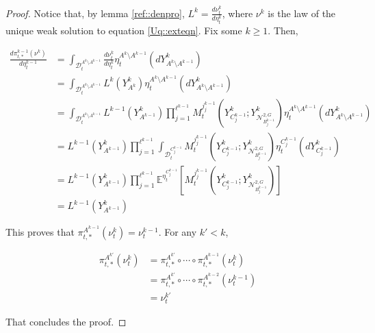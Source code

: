 \documentclass[12pt]{article}
\newcommand{\mb}{\mathbb}
\newcommand{\mc}{\mathcal}
\newcommand{\exmu}[2]{\mb{E}^{#1}\left[#2\right]}	%
\newcommand{\cad}{\mc{D}}							%
\newcommand{\dgneigh}[2]{\mc{N}^{2,#1}_{#2}}		%
\newcommand{\indx}[1]{^{#1}}						%
\newcommand{\proj}{\pi}								%
\newcommand{\vind}[1]{_{#1}}						%
\newcommand{\vpara}[1]{^{#1}}						%
\newcommand{\tpara}[1]{_{#1}}						%
\newcommand{\tparapsf}[1]{_{#1,*}}					%
\newcommand{\psize}{\ell}							%
\newcommand{\Xg}{Y}									%
\newcommand{\mm}{\nu}								%
\newcommand{\mmm}{\eta}								%
\newcommand{\dense}{L}								%
\newcommand{\mdense}{M}								%
\newcommand{\jpara}[1]{^{#1}}						%
\begin{document}
\begin{proof}
Notice that, by lemma \ref{ref::denpro}, \(\dense\indx{k} = \frac{d\mm\indx{k}\tpara{t}}{d\mmm\indx{k}\tpara{t}}\), where \(\mm\indx{k}\) is the law of the unique weak solution to equation \eqref{Uq::exteqn}. Fix some \(k \geq 1\). Then,

\begin{align*}
\frac{d\proj\tparapsf{t}\indx{k-1}(\mm\indx{k})}{d\mmm\indx{k-1}\tpara{t}} &= \int_{\cad\vpara{A\indx{k}\setminus A\indx{k-1}}\tpara{t}} \frac{d\mm\indx{k}\tpara{t}}{d\mmm\indx{k}\tpara{t}}\mmm\vpara{A\indx{k}\setminus A\indx{k-1}}\tpara{t}(d\Xg\indx{k}\vind{A\indx{k}\setminus A\indx{k-1}})\\
&=\int_{\cad\vpara{A\indx{k}\setminus A\indx{k-1}}\tpara{t}} \dense\indx{k}(\Xg\indx{k}\vind{A\indx{k}})\mmm\vpara{A\indx{k}\setminus A\indx{k-1}}\tpara{t}(d\Xg\indx{k}\vind{A\indx{k}\setminus A\indx{k-1}})\\
&=\int_{\cad\vpara{A\indx{k}\setminus A\indx{k-1}}\tpara{t}} \dense\indx{k-1}(\Xg\indx{k}\vind{A\indx{k-1}})\prod_{j=1}^{\psize\indx{k-1}}\mdense\jpara{j_j\indx{k-1}}\tpara{t}\left(\Xg\indx{k}\vind{C_j\indx{k-1}};\Xg\indx{k}\vind{\dgneigh{G}{B_j\indx{k-1}}}\right)\mmm\vpara{A\indx{k}\setminus A\indx{k-1}}\tpara{t}(d\Xg\indx{k}\vind{A\indx{k}\setminus A\indx{k-1}})\\
&=\dense\indx{k-1}(\Xg\indx{k}\vind{A\indx{k-1}})\prod_{j=1}^{\psize\indx{k-1}} \int_{\cad\vpara{C_j\indx{k-1}}\tpara{t}}\mdense\jpara{j_j\indx{k-1}}\tpara{t}\left(\Xg\indx{k}\vind{C_j\indx{k-1}};\Xg\indx{k}\vind{\dgneigh{G}{B_j\indx{k-1}}}\right)\mmm\vpara{C_j\indx{k-1}}\tpara{t}(d\Xg\indx{k}\vind{C_j\indx{k-1}})\\
&=\dense\indx{k-1}(\Xg\indx{k}\vind{A\indx{k-1}})\prod_{j=1}^{\psize\indx{k-1}} \exmu{\mmm\vpara{C_j\indx{k-1}}\tpara{t}}{\mdense\jpara{j_j\indx{k-1}}\tpara{t}\left(\Xg\indx{k}\vind{C_j\indx{k-1}};\Xg\indx{k}\vind{\dgneigh{G}{B_j\indx{k-1}}}\right)}\\
&=\dense\indx{k-1}(\Xg\indx{k}\vind{A\indx{k-1}})
\end{align*}

This proves that \(\proj\tparapsf{t}\vpara{A\indx{k-1}}(\mm\indx{k}\tpara{t}) = \mm\indx{k-1}\tpara{t}\). For any \(k' < k\),

\begin{align*}
\proj\tparapsf{t}\vpara{A\indx{k'}}(\mm\indx{k}\tpara{t}) &= \proj\tparapsf{t}\vpara{A\indx{k'}}\circ\cdots\circ\proj\tparapsf{t}\vpara{A\indx{k-1}}(\mm\indx{k}\tpara{t})\\
&=\proj\tparapsf{t}\vpara{A\indx{k'}}\circ\cdots\circ\proj\tparapsf{t}\vpara{A\indx{k-2}}(\mm\indx{k-1}\tpara{t})\\
&= \mm\indx{k'}\tpara{t}
\end{align*}

That concludes the proof.
\end{proof}
\end{document}
